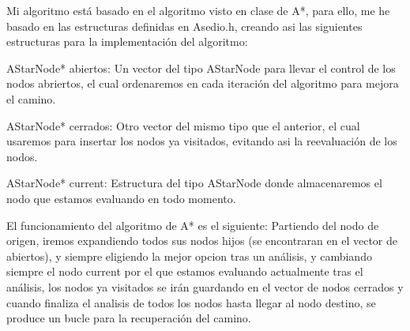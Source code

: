 Mi algoritmo está basado en el algoritmo visto en clase de A*, para ello, me he basado en las estructuras definidas en Asedio.h, creando asi las siguientes estructuras para la implementación del algoritmo:

AStarNode* abiertos: Un vector del tipo AStarNode para llevar el control de los nodos abriertos, el cual ordenaremos en cada iteración del algoritmo para mejora el camino.

AStarNode* cerrados: Otro vector del mismo tipo que el anterior, el cual usaremos para insertar los nodos ya visitados, evitando asi la reevaluación de los nodos.

AStarNode* current: Estructura del tipo AStarNode donde almacenaremos el nodo que estamos evaluando en todo momento.

El funcionamiento del algoritmo de A* es el siguiente: Partiendo del nodo de origen, iremos expandiendo todos sus nodos hijos (se encontraran en el vector de abiertos), y siempre eligiendo la mejor opcion tras un análisis, y cambiando siempre el nodo current por el que estamos evaluando actualmente tras el análisis, los nodos ya visitados se irán guardando en el vector de nodos cerrados y cuando finaliza el analisis de todos los nodos hasta llegar al nodo destino, se produce un bucle para la recuperación del camino.

